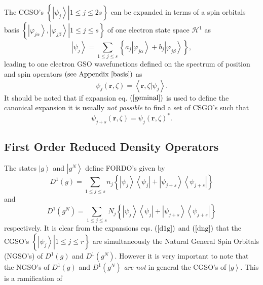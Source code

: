 \documentclass[aps,preprint]{revtex4}%
\begin{document}
The CGSO's $\left\{  \left.  \left\vert \psi_{j}\right\rangle \right\vert
1\leq j\leq2s\right\}  $ can be expanded in terms of a spin orbitals basis
$\left\{  \left.  \left\vert \varphi_{j\alpha}\right\rangle ,\left\vert
\varphi_{j\beta}\right\rangle \right\vert 1\leq j\leq s\right\}  $ of one
electron state space $\mathcal{H}^{1}$ as
\begin{equation}
\left\vert \psi_{j}\right\rangle =\sum_{1\leq j\leq s}\left\{  a_{j}\left\vert
\varphi_{j\alpha}\right\rangle +b_{j}\left\vert \varphi_{j\beta}\right\rangle
\right\}  ,
\end{equation}
leading to one electron GSO wavefunctions defined on the spectrum of position
and spin operators $\left(  \text{see Appendix \ref{basis}}\right)  $ as
\begin{equation}
\psi_{j}\left(  \mathbf{r,}\zeta\right)  =\left\langle \left.  \mathbf{r,}%
\zeta\right\vert \psi_{j}\right\rangle .
\end{equation}
It should be noted that if expansion eq. $\left(  \ref{geminal}\right)  $ is
used to define the canonical expansion it is usually \emph{not possible} to
find a set of CSGO's such that
\begin{equation}
\psi_{j+s}\left(  \mathbf{r,}\zeta\right)  =\psi_{j}\left(  \mathbf{r,}%
\zeta\right)  ^{\ast}.
\end{equation}


\subsection{First Order Reduced Density Operators}

The states $\left\vert g\right\rangle $ and $\left\vert g^{N}\right\rangle $
define FORDO's given by \cite{Coleman}
\begin{equation}
D^{1}\left(  g\right)  =\sum_{1\leq j\leq s}n_{j}\left\{  \left\vert \psi
_{j}\right\rangle \left\langle \psi_{j}\right\vert +\left\vert \psi
_{j+s}\right\rangle \left\langle \psi_{j+s}\right\vert \right\}  \label{d1g}%
\end{equation}
and
\begin{equation}
D^{1}\left(  g^{N}\right)  =\sum_{1\leq j\leq s}N_{j}\left\{  \left\vert
\psi_{j}\right\rangle \left\langle \psi_{j}\right\vert +\left\vert \psi
_{j+s}\right\rangle \left\langle \psi_{j+s}\right\vert \right\}  \label{dng}%
\end{equation}
respectively. It is clear from the expansions eqs. $\left(  \ref{d1g}\right)
$ and $\left(  \ref{dng}\right)  $ that the CGSO's $\left\{  \left.
\left\vert \psi_{j}\right\rangle \right\vert 1\leq j\leq r\right\}  $ are
simultaneously the Natural General Spin Orbitals (NGSO's) of $D^{1}\left(
g\right)  $ and $D^{1}\left(  g^{N}\right)  $. However it is very important to
note that the NGSO's of $D^{1}\left(  g\right)  $ and $D^{1}\left(
g^{N}\right)  $ \emph{are not }in general the CGSO's of $\left\vert
g\right\rangle $. This is a ramification of
\end{document}
